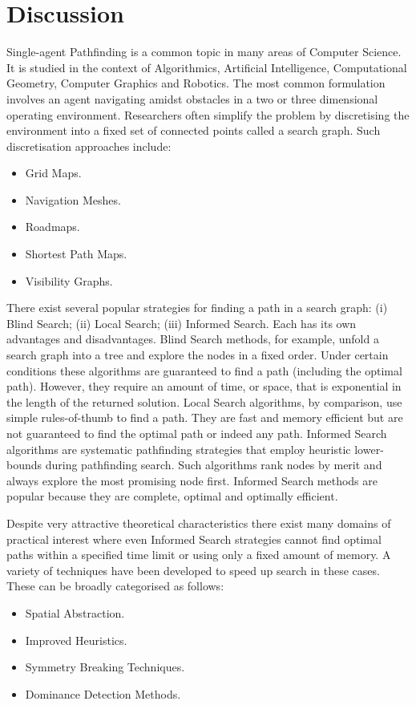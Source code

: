 \section{Discussion}
\label{cha::lit::discussion}
Single-agent Pathfinding is a common topic in many areas of Computer Science. It is studied in the
context of Algorithmics, Artificial Intelligence, Computational Geometry, Computer Graphics and
Robotics.  The most common formulation involves an agent navigating amidst obstacles in a two or
three dimensional operating environment.  Researchers often simplify the problem by discretising the
environment into a fixed set of connected points called a search graph. Such discretisation
approaches include:
\begin{itemize}
\item Grid Maps.
\item Navigation Meshes.
\item Roadmaps.
\item Shortest Path Maps.
\item Visibility Graphs.
\end{itemize}

There exist several popular strategies for finding a path in a search graph: (i)
Blind Search; (ii) Local Search; (iii) Informed Search. Each has its own advantages and 
disadvantages. Blind Search methods, for example, unfold a search graph into a tree and
explore the nodes in a fixed order. Under certain conditions these algorithms are 
guaranteed to find a path (including the optimal path). However, they
require an amount of time, or space, that is exponential in the length of the returned 
solution.
Local Search algorithms, by comparison, use simple rules-of-thumb to find a path.
They are fast and memory efficient but are not guaranteed to find the optimal 
path or indeed any path.
Informed Search algorithms are systematic pathfinding strategies that employ heuristic
lower-bounds during pathfinding search. Such algorithms rank 
nodes by merit and always explore the most promising node first. Informed Search methods
are popular because they are complete, optimal and optimally efficient. 

Despite very attractive theoretical characteristics there exist many domains of practical 
interest where even Informed Search strategies cannot find optimal paths within a specified
time limit or using only a fixed amount of memory. A variety of techniques have been
developed to speed up search in these cases. These can be broadly categorised as follows:
\begin{itemize}
\item Spatial Abstraction.
\item Improved Heuristics.
\item Symmetry Breaking Techniques.
\item Dominance Detection Methods.
\end{itemize}

